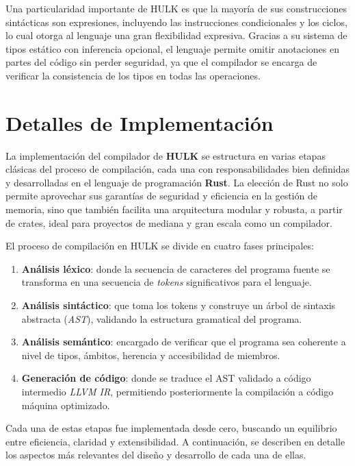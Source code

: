 \documentclass{article}
\begin{document}
Una particularidad importante de HULK es que la mayoría de sus construcciones sintácticas son expresiones, incluyendo las instrucciones condicionales y los ciclos, lo cual otorga al lenguaje una gran flexibilidad expresiva. Gracias a su sistema de tipos estático con inferencia opcional, el lenguaje permite omitir anotaciones en partes del código sin perder seguridad, ya que el compilador se encarga de verificar la consistencia de los tipos en todas las operaciones.

\section{Detalles de Implementación}

La implementación del compilador de \textbf{HULK} se estructura en varias etapas clásicas del proceso de compilación, cada una con responsabilidades bien definidas y desarrolladas en el lenguaje de programación \textbf{Rust}. La elección de Rust no solo permite aprovechar sus garantías de seguridad y eficiencia en la gestión de memoria, sino que también facilita una arquitectura modular y robusta, a partir de crates, ideal para proyectos de mediana y gran escala como un compilador.

El proceso de compilación en HULK se divide en cuatro fases principales:

\begin{enumerate}
    \item \textbf{Análisis léxico}: donde la secuencia de caracteres del programa fuente se transforma en una secuencia de \textit{tokens} significativos para el lenguaje.
    
    \item \textbf{Análisis sintáctico}: que toma los tokens y construye un árbol de sintaxis abstracta (\textit{AST}), validando la estructura gramatical del programa.
    
    \item \textbf{Análisis semántico}: encargado de verificar que el programa sea coherente a nivel de tipos, ámbitos, herencia y accesibilidad de miembros.
    
    \item \textbf{Generación de código}: donde se traduce el AST validado a código intermedio \textit{LLVM IR}, permitiendo posteriormente la compilación a código máquina optimizado.
\end{enumerate}

Cada una de estas etapas fue implementada desde cero, buscando un equilibrio entre eficiencia, claridad y extensibilidad. A continuación, se describen en detalle los aspectos más relevantes del diseño y desarrollo de cada una de ellas.
\end{document}
